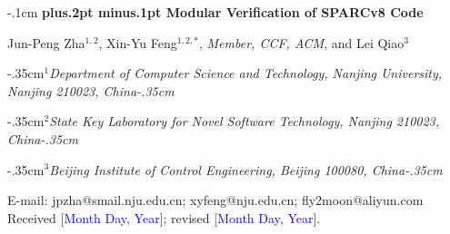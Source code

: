 \documentclass[twoside]{article}
\def\title#1{\vspace{3mm}\begin{flushleft}\vglue-.1cm\Large\bf\boldmath\protect\baselineskip=18pt plus.2pt minus.1pt #1
\end{flushleft}\vspace{1mm} }
\def\author#1{\begin{flushleft}\normalsize #1\end{flushleft}\vspace*{-4pt} \vspace{3mm}}
\def\address#1#2{\begin{flushleft}\vglue-.35cm${}^{#1}$\small\it #2\vglue-.35cm\end{flushleft}\vspace{-2mm}\par}
\begin{document}
\begin{CJK*}{GBK}{song}
\thispagestyle{empty}
\vspace*{-13mm}
\vspace*{2mm}

\title{Modular Verification of SPARCv8 Code}

\author{Jun-Peng Zha$^{1,2}$, Xin-Yu Feng$^{1,2,*}$, \textit{Member, CCF, ACM}, 
  and Lei Qiao$^{3}$}

\address{1}{Department of Computer Science and Technology, Nanjing University, Nanjing 210023, China}
\address{2}{State Key Laboratory for Novel Software Technology, Nanjing 210023, China}
\address{3}{Beijing Institute of Control Engineering, Beijing 100080, China}

\vspace{2mm}

\noindent E-mail: jpzha@smail.nju.edu.cn; xyfeng@nju.edu.cn;
fly2moon@aliyun.com  \\[-1mm]





\noindent Received [\textcolor{blue}{Month Day, Year}]; revised [\textcolor{blue}{Month Day, Year}].\\[1mm]


\end{CJK*}
\end{document}
